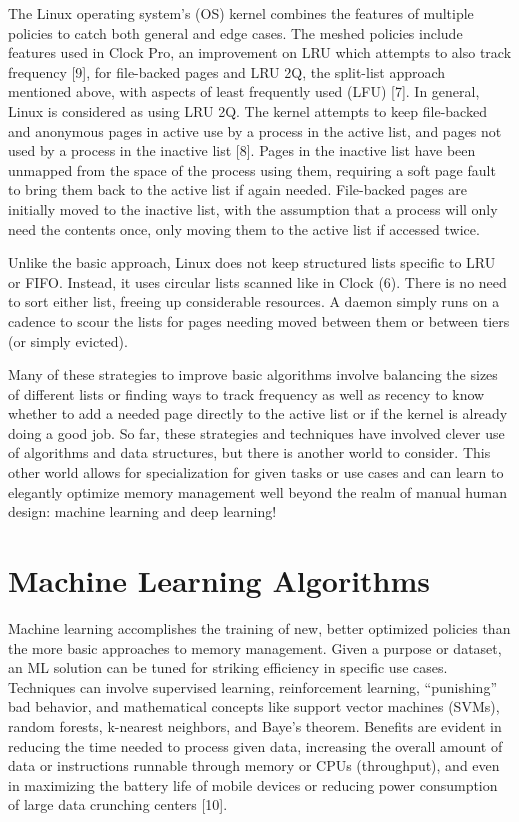 \documentclass[conference]{IEEEtran}
\begin{document}
The Linux operating system’s (OS) kernel combines the features of multiple policies to catch both general and edge cases.  The meshed policies include features used in Clock Pro, an improvement on LRU which attempts to also track frequency [9], for file-backed pages and LRU 2Q, the split-list approach mentioned above, with aspects of least frequently used (LFU) [7].  In general, Linux is considered as using LRU 2Q.  The kernel attempts to keep file-backed and anonymous pages in active use by a process in the active list, and pages not used by a process in the inactive list [8].  Pages in the inactive list have been unmapped from the space of the process using them, requiring a soft page fault to bring them back to the active list if again needed.  File-backed pages are initially moved to the inactive list, with the assumption that a process will only need the contents once, only moving them to the active list if accessed twice. 

Unlike the basic approach, Linux does not keep structured lists specific to LRU or FIFO.  Instead, it uses circular lists scanned like in Clock (6).  There is no need to sort either list, freeing up considerable resources.  A daemon simply runs on a cadence to scour the lists for pages needing moved between them or between tiers (or simply evicted). 

Many of these strategies to improve basic algorithms involve balancing the sizes of different lists or finding ways to track frequency as well as recency to know whether to add a needed page directly to the active list or if the kernel is already doing a good job.  So far, these strategies and techniques have involved clever use of algorithms and data structures, but there is another world to consider.  This other world allows for specialization for given tasks or use cases and can learn to elegantly optimize memory management well beyond the realm of manual human design: machine learning and deep learning! 

\section{Machine Learning Algorithms}

Machine learning accomplishes the training of new, better optimized policies than the more basic approaches to memory management.  Given a purpose or dataset, an ML solution can be tuned for striking efficiency in specific use cases.  Techniques can involve supervised learning, reinforcement learning, “punishing” bad behavior, and mathematical concepts like support vector machines (SVMs), random forests, k-nearest neighbors, and Baye’s theorem.  Benefits are evident in reducing the time needed to process given data, increasing the overall amount of data or instructions runnable through memory or CPUs (throughput), and even in maximizing the battery life of mobile devices or reducing power consumption of large data crunching centers [10]. 
\end{document}
